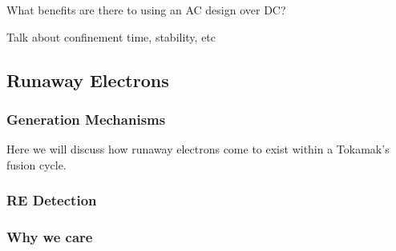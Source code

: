 What benefits are there to using an AC design over DC?

Talk about confinement time, stability, etc

\subsection{Runaway Electrons}

\subsubsection{Generation Mechanisms}

Here we will discuss how runaway electrons come to exist within a Tokamak's fusion cycle.

\subsubsection{RE Detection}

\subsubsection{Why we care}

